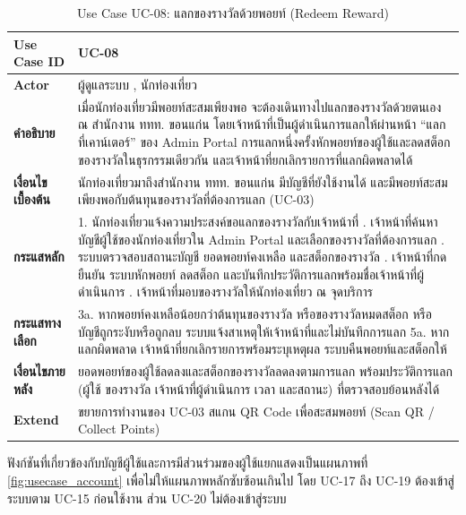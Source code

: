 \begin{table}[H]
\centering
\caption{Use Case UC-08: แลกของรางวัลด้วยพอยท์ (Redeem Reward)}
\label{tab:uc08}
\begin{tabular}{|p{3.2cm}|p{10cm}|}
\hline
\textbf{Use Case ID} & UC-08 \\ \hline
\textbf{Actor} & ผู้ดูแลระบบ , นักท่องเที่ยว \\ \hline
\textbf{คำอธิบาย} & เมื่อนักท่องเที่ยวมีพอยท์สะสมเพียงพอ จะต้องเดินทางไปแลกของรางวัลด้วยตนเอง ณ สำนักงาน ททท. ขอนแก่น โดยเจ้าหน้าที่เป็นผู้ดำเนินการแลกให้ผ่านหน้า ``แลกที่เคาน์เตอร์'' ของ Admin Portal การแลกหนึ่งครั้งหักพอยท์ของผู้ใช้และลดสต็อกของรางวัลในธุรกรรมเดียวกัน และเจ้าหน้าที่ยกเลิกรายการที่แลกผิดพลาดได้ \\ \hline
\textbf{เงื่อนไขเบื้องต้น} & นักท่องเที่ยวมาถึงสำนักงาน ททท. ขอนแก่น มีบัญชีที่ยังใช้งานได้ และมีพอยท์สะสมเพียงพอกับต้นทุนของรางวัลที่ต้องการแลก (UC-03) \\ \hline
\textbf{กระแสหลัก} & 1. นักท่องเที่ยวแจ้งความประสงค์ขอแลกของรางวัลกับเจ้าหน้าที่ \newline 2. เจ้าหน้าที่ค้นหาบัญชีผู้ใช้ของนักท่องเที่ยวใน Admin Portal และเลือกของรางวัลที่ต้องการแลก \newline 3. ระบบตรวจสอบสถานะบัญชี ยอดพอยท์คงเหลือ และสต็อกของรางวัล \newline 4. เจ้าหน้าที่กดยืนยัน ระบบหักพอยท์ ลดสต็อก และบันทึกประวัติการแลกพร้อมชื่อเจ้าหน้าที่ผู้ดำเนินการ \newline 5. เจ้าหน้าที่มอบของรางวัลให้นักท่องเที่ยว ณ จุดบริการ \\ \hline
\textbf{กระแสทางเลือก} & 3a. หากพอยท์คงเหลือน้อยกว่าต้นทุนของรางวัล หรือของรางวัลหมดสต็อก หรือบัญชีถูกระงับหรือถูกลบ ระบบแจ้งสาเหตุให้เจ้าหน้าที่และไม่บันทึกการแลก \newline 5a. หากแลกผิดพลาด เจ้าหน้าที่ยกเลิกรายการพร้อมระบุเหตุผล ระบบคืนพอยท์และสต็อกให้ \\ \hline
\textbf{เงื่อนไขภายหลัง} & ยอดพอยท์ของผู้ใช้ลดลงและสต็อกของรางวัลลดลงตามการแลก พร้อมประวัติการแลก (ผู้ใช้ ของรางวัล เจ้าหน้าที่ผู้ดำเนินการ เวลา และสถานะ) ที่ตรวจสอบย้อนหลังได้ \\ \hline
\textbf{Extend} & ขยายการทำงานของ UC-03 สแกน QR Code เพื่อสะสมพอยท์ (Scan QR / Collect Points) \\
\hline
\end{tabular}
\end{table}

ฟังก์ชันที่เกี่ยวข้องกับบัญชีผู้ใช้และการมีส่วนร่วมของผู้ใช้แยกแสดงเป็นแผนภาพที่ \ref{fig:usecase_account} เพื่อไม่ให้แผนภาพหลักซับซ้อนเกินไป โดย UC-17 ถึง UC-19 ต้องเข้าสู่ระบบตาม UC-15 ก่อนใช้งาน ส่วน UC-20 ไม่ต้องเข้าสู่ระบบ

